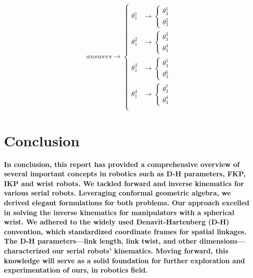 \documentclass[conference]{IEEEtran}
\begin{document}
\begin{large}
    \begin{align*}
         & answers \longrightarrow \begin{cases}
                                       \theta_1 ^1 & \longrightarrow \begin{cases}
                                              \theta_3 ^1 \\[10pt]
                                              \theta_3 ^2
                                          \end{cases} \\[30pt]
                                       \theta_1 ^2 & \longrightarrow \begin{cases}
                                              \theta_3 ^3 \\[10pt]
                                              \theta_3 ^4
                                          \end{cases} \\[30pt]
                                       \theta_1 ^3 & \longrightarrow \begin{cases}
                                              \theta_3 ^5 \\[10pt]
                                              \theta_3 ^6
                                          \end{cases} \\[30pt]
                                       \theta_1 ^4 & \longrightarrow \begin{cases}
                                              \theta_3 ^7 \\[10pt]
                                              \theta_3 ^8
                                          \end{cases} \\
                                   \end{cases}
    \end{align*}
\end{large}

\vspace{30px}

\section{Conclusion}
\textbf{
    In conclusion, this report has provided a comprehensive overview of several important concepts in robotics such as D-H parameters, FKP, IKP and wrist robots. We tackled forward and inverse kinematics for various serial robots. Leveraging conformal geometric algebra, we derived elegant formulations for both problems. Our approach excelled in solving the inverse kinematics for manipulators with a spherical wrist. We adhered to the widely used Denavit-Hartenberg (D-H) convention, which standardized coordinate frames for spatial linkages. The D-H parameters—link length, link twist, and other dimensions—characterized our serial robots' kinematics. Moving forward, this knowledge will serve as a solid foundation for further exploration and experimentation of ours, in robotics field.
}
\vspace{20px}
\end{document}
